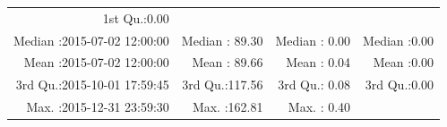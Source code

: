 \documentclass[
  10pt,
  a4paper,oneside]{article}
\begin{document}
\begin{longtable}[]{@{}rrrr@{}}
\begin{minipage}[t]{0.18\columnwidth}
1st Qu.:0.00\strut
\end{minipage}\tabularnewline
\begin{minipage}[t]{0.34\columnwidth}\raggedleft
Median :2015-07-02 12:00:00\strut
\end{minipage} & \begin{minipage}[t]{0.19\columnwidth}\raggedleft
Median : 89.30\strut
\end{minipage} & \begin{minipage}[t]{0.18\columnwidth}\raggedleft
Median : 0.00\strut
\end{minipage} & \begin{minipage}[t]{0.18\columnwidth}\raggedleft
Median :0.00\strut
\end{minipage}\tabularnewline
\begin{minipage}[t]{0.34\columnwidth}\raggedleft
Mean :2015-07-02 12:00:00\strut
\end{minipage} & \begin{minipage}[t]{0.19\columnwidth}\raggedleft
Mean : 89.66\strut
\end{minipage} & \begin{minipage}[t]{0.18\columnwidth}\raggedleft
Mean : 0.04\strut
\end{minipage} & \begin{minipage}[t]{0.18\columnwidth}\raggedleft
Mean :0.00\strut
\end{minipage}\tabularnewline
\begin{minipage}[t]{0.34\columnwidth}\raggedleft
3rd Qu.:2015-10-01 17:59:45\strut
\end{minipage} & \begin{minipage}[t]{0.19\columnwidth}\raggedleft
3rd Qu.:117.56\strut
\end{minipage} & \begin{minipage}[t]{0.18\columnwidth}\raggedleft
3rd Qu.: 0.08\strut
\end{minipage} & \begin{minipage}[t]{0.18\columnwidth}\raggedleft
3rd Qu.:0.00\strut
\end{minipage}\tabularnewline
\begin{minipage}[t]{0.34\columnwidth}\raggedleft
Max. :2015-12-31 23:59:30\strut
\end{minipage} & \begin{minipage}[t]{0.19\columnwidth}\raggedleft
Max. :162.81\strut
\end{minipage} & \begin{minipage}[t]{0.18\columnwidth}\raggedleft
Max. : 0.40\strut

\end{minipage}
\end{longtable}
\end{document}
